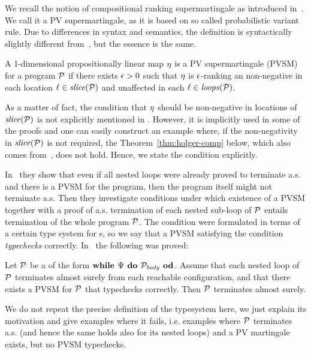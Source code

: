 We recall the notion of compositional ranking supermartingale as introduced in~\cite{HolgerPOPL}. We call it a PV supermartingale, as it is based on so called probabilistic variant rule. Due to differences in syntax and semantics, the definition is syntactically slightly different from~\cite{HolgerPOPL}, but the essence is the same. 

\begin{definition}
A 1-dimensional propositionally linear map $\eta$ is a PV supermartingale (PVSM) for a program $\mathcal{P}$ if there exists $\epsilon>0$ such that $\eta$ is $\epsilon$-ranking an non-negative in each location $\ell\in\mathit{slice}{(\mathcal{P})}$ and unaffected in each $\ell\in\mathit{loops}(\mathcal{P})$.
\end{definition}

As a matter of fact, the condition that $\eta$ should be non-negative in locations of $\mathit{slice}{(\mathcal{P})}$ is not explicitly mentioned in \cite{HolgerPOPL}. However, it is implicitly used in some of the proofs and one can easily construct an example where, if the non-negativity in $\mathit{slice}{(\mathcal{P})}$ is not required, the Theorem~\ref{thm:holger-comp} below, which also comes from~\cite{HolgerPOPL}, does not hold. Hence, we state the condition explicitly.

In~\cite{HolgerPOPL} they show that even if all nested loops were already proved to terminate a.s. and there is a PVSM for the program, then the program itself might not terminate a.s. Then they investigate conditions under which existence of a PVSM together with a proof of a.s. termination of each nested sub-loop of $\mathcal{P}$ entails termination of the whole program $\mathcal{P}$. The condition were formulated in terms of a certain type system for \PP{}s, so we say that a PVSM satisfying the condition \emph{typechecks} correctly. In~\cite{HolgerPOPL} the following was proved:

\begin{theorem}
\label{thm:holger-comp}
Let $\mathcal{P}$ be a \PP{} of the form $\textbf{while } \Psi \textbf{ do } 
\mathcal{P}_{\mathit{body}} \textbf{ od}$. Assume that each nested loop of $\mathcal{P}$ terminates almost surely from each reachable configuration, and that there exists a PVSM for $\mathcal{P}$ that typechecks correctly. Then $\mathcal{P}$ terminates almost surely.
\end{theorem}

We do not repeat the precise definition of the typesystem here, we just explain its motivation and give examples where it fails, i.e. examples where $\mathcal{P}$ terminates a.s. (and hence the same holds also for its nested loops) and a PV martingale exists, but no PVSM typechecks.  

